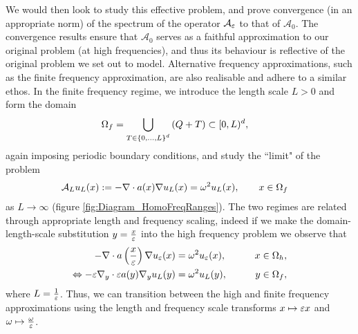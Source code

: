 We would then look to study this effective problem, and prove convergence (in an appropriate norm) of the spectrum of the operator $\mathcal{A}_{\varepsilon}$ to that of $\mathcal{A}_0$.
The convergence results ensure that $\mathcal{A}_0$ serves as a faithful approximation to our original problem (at high frequencies), and thus its behaviour is reflective of the original problem we set out to model.
Alternative frequency approximations, such as the finite frequency approximation, are also realisable and adhere to a similar ethos.
In the finite frequency regime, we introduce the length scale $L>0$ and form the domain
\begin{align*}
	\Omega_f &= \bigcup_{T\in\left\{ 0,...,L \right\}^d}\left( Q + T \right)\subset[0,L)^d,
\end{align*}
again imposing periodic boundary conditions, and study the ``limit" of the problem
\begin{align*}
	\mathcal{A}_L u_L(x) &:= -\nabla\cdot a(x)\nabla u_L(x) = \omega^2 u_L(x), \qquad x\in\Omega_f
\end{align*}
as $L\rightarrow\infty$ (figure \ref{fig:Diagram_HomoFreqRanges}).
The two regimes are related through appropriate length and frequency scaling, indeed if we make the domain-length-scale substitution $y = \frac{x}{\varepsilon}$ into the high frequency problem we observe that
\begin{align*}
	-\nabla\cdot a\left( \frac{x}{\varepsilon} \right)\nabla u_{\varepsilon}(x) &= \omega^2 u_{\varepsilon}(x), &\qquad x\in\Omega_h, \\
	\Leftrightarrow -\varepsilon\nabla_{y}\cdot \varepsilon a(y)\nabla_{y}u_{L}(y) &= \omega^2 u_{L}(y), &\qquad y\in\Omega_f,
\end{align*}
where $L = \frac{1}{\varepsilon}$.
Thus, we can transition between the high and finite frequency approximations using the length and frequency scale transforms $x \mapsto \varepsilon x$ and $\omega \mapsto \frac{\omega}{\varepsilon}$.

